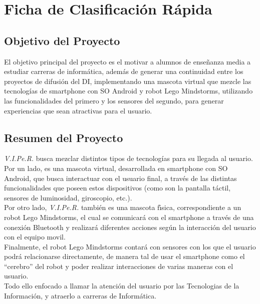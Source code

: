 \documentclass[letterpaper,12pt]{article} %
\numberwithin{equation}{section} %
\numberwithin{figure}{section} %
\numberwithin{table}{section} %
\begin{document}
\setcounter{page}{1} %

\tableofcontents
\newpage

\section{Ficha de Clasificaci\'on R\'apida}
\subsection{Objetivo del Proyecto} %
El objetivo principal del proyecto es el motivar a alumnos de ense\~nanza media a estudiar carreras de inform\'atica, adem\'as de generar una continuidad entre los proyectos de difusi\'on del DI, implementando una mascota virtual que mezcle las tecnolog\'ias de smartphone con SO Android y robot Lego Mindstorms, utilizando las funcionalidades del primero y los sensores del segundo, para generar experiencias que sean atractivas para el usuario.\\

\subsection{Resumen del Proyecto} %

\emph{V.I.Pe.R.} busca mezclar distintos tipos de tecnolog\'ias para su llegada al usuario.\\

Por un lado, es una mascota virtual, desarrollada en smartphone con SO Android, que busca interactuar con el usuario final, a trav\'es de las distintas funcionalidades que poseen estos dispositivos (como son la pantalla t\'actil, sensores de luminosidad, giroscopio, etc.).\\

Por otro lado, \emph{V.I.Pe.R.} tambi\'en es una mascota f\'{\i}sica, correspondiente a un robot Lego Mindstorms, el cual se comunicar\'a con el smartphone a trav\'es de una conexi\'on Bluetooth y realizar\'a diferentes acciones seg\'un la interacci\'on del usuario con el equipo movil.\\

Finalmente, el robot Lego Mindstorms contar\'a con sensores con los que el usuario podr\'a relacionarse directamente, de manera tal de usar el smartphone como el ``cerebro'' del robot y poder realizar interacciones de varias maneras con el usuario.\\

Todo ello enfocado a llamar la atenci\'on del usuario por las Tecnologias de la Informaci\'on, y atraerlo a carreras de Inform\'atica.\\
\end{document}
